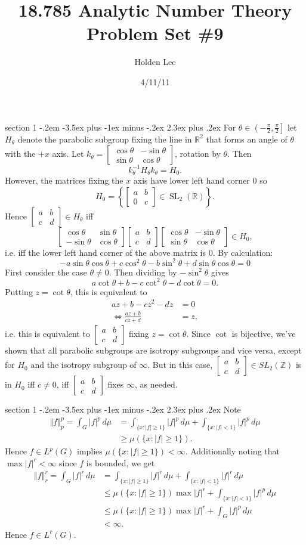 \documentclass[12pt]{article}
\makeatletter
\theoremstyle{norm}
\newcommand{\R}[0]{\mathbb{R}}
\newcommand{\Z}[0]{\mathbb{Z}}
\newcommand{\bc}[1]{\left\{ {#1} \right\}}
\newcommand{\ve}[1]{\left\Vert{#1}\right\Vert}
\newcommand{\SL}{\operatorname{SL}}
\newcommand{\matt}[4]{
\left[
\begin{matrix}
{#1}&{#2}\\
{#3}&{#4}
\end{matrix}
\right]}
\newcommand{\smatt}[4]{
\left[
\begin{smallmatrix}
{#1}&{#2}\\
{#3}&{#4}
\end{smallmatrix}
\right]}
\newcommand{\iy}[0]{\infty}
\newenvironment{problem}{\@startsection
       {section}
       {1}
       {-.2em}
       {-3.5ex plus -1ex minus -.2ex}
       {2.3ex plus .2ex}
       {\pagebreak[3]%
       \large\bf\noindent{Problem }
       }
       }
       {%
       }
\makeatother
\begin{document}
\title{18.785 Analytic Number Theory Problem Set \#9}%
\author{Holden Lee}
\date{4/11/11}%
\maketitle
\thispagestyle{empty}

\begin{problem}{\it }
For $\theta\in \left(-\frac{\pi}{2},\frac{\pi}{2}\right]$ let $H_{\theta}$ denote the parabolic subgroup fixing the line in $\R^2$ that forms an angle of $\theta$ with the $+x$ axis.
Let $k_{\theta}=\smatt{\cos \theta}{-\sin\theta}{\sin\theta}{\cos\theta}$, rotation by $\theta$. Then
\[
k_{\theta}^{-1}H_{\theta}k_{\theta}=H_0.
\]
However, the matrices fixing the $x$ axis have lower left hand corner 0 so
\[
H_0=\bc{\matt ab0{c}\in \SL_2(\R)}.
\]
Hence $\smatt abcd\in H_{\theta}$ iff
\[
\matt{\cos \theta}{\sin\theta}{-\sin\theta}{\cos\theta}
\matt abcd
\matt{\cos\theta}{-\sin\theta}{\sin \theta}{\cos \theta}\in H_0,
\]
i.e. iff the lower left hand corner of the above matrix is 0. By calculation:
\[
-a\sin \theta\cos \theta+c\cos^2\theta-b\sin^2\theta+d\sin\theta\cos\theta=0
\]
First consider the case $\theta\ne 0$. Then dividing by $-\sin^2\theta$ gives
\[
a\cot\theta+b-c\cot^2\theta-d\cot \theta=0.
\]
Putting $z=\cot\theta$, this is equivalent to
\begin{align*}
az+b-cz^2-dz&=0\\
\iff \frac{az+b}{cz+d}&=z,
\end{align*}
i.e. this is equivalent to $\smatt abcd$ fixing $z=\cot\theta$. Since $\cot$ is bijective, we've shown that all parabolic subgroups are isotropy subgroups and vice versa, except for $H_0$ and the isotropy subgroup of $\iy$. But in this case, $\smatt abcd\in SL_2(\Z)$ is in $H_0$ iff $c\neq 0$, iff $\smatt abcd$ fixes $\iy$, as needed.

\end{problem}
\begin{problem}{\it }
Note
\begin{align*}
\ve{f}_p^p=\int_G|f|^p\,d\mu&=\int_{\{x:|f|\ge 1\}} |f|^p \,d\mu+\int_{\{x:|f|<1\}} |f|^p\,d\mu\\
&\ge \mu(\{x:|f|\ge 1\}).
\end{align*}
Hence $f\in L^p(G)$ implies $ \mu(\{x:|f|\ge 1\})<\iy$. %
Additionally noting that $\max |f|^r<\iy$ since $f$ is bounded, we get
\begin{align*}
\ve{f}_r^r=\int_G|f|^r\,d\mu&=\int_{\{x:|f|\ge 1\}} |f|^r \,d\mu+\int_{\{x:|f|<1\}} |f|^r\,d\mu\\
&\le \mu(\{x:|f|\ge 1\})\max|f|^r+\int_{\{x:|f|<1\}}|f|^p\,d\mu\\
&\le \mu(\{x:|f|\ge 1\})\max|f|^r+\int_{G}|f|^p\,d\mu\\
&<\iy.
\end{align*}
Hence $f\in L^r(G)$.
\end{problem}
\end{document}
